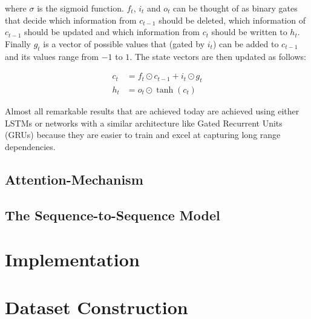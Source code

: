 \noindent where \(\sigma\) is the sigmoid function. \(f_t\), \(i_t\) and \(o_t\) can be thought of as binary gates that decide which information from \(c_{t-1}\) should be deleted, which information of \(c_{t-1}\) should be updated and which information from \(c_t\) should be written to \(h_t\).  Finally \(g_t\) is a vector of possible values that (gated by \(i_t\)) can be added to \(c_{t-1}\) and its values range from \(-1\) to \(1\). The state vectors are then updated as follows:

\begin{align*}
  c_t &= f_t \odot c_{t-1} + i_t \odot g_t \\
  h_t &= o_t \odot \tanh(c_t)
\end{align*}

Almost all remarkable results that are achieved today are achieved using either LSTMs or networks with a similar architecture like Gated Recurrent Units (GRUs) because they are easier to train and excel at capturing long range dependencies.



\subsection{Attention-Mechanism}

\subsection{The Sequence-to-Sequence Model}

\section{Implementation}

\section{Dataset Construction}
